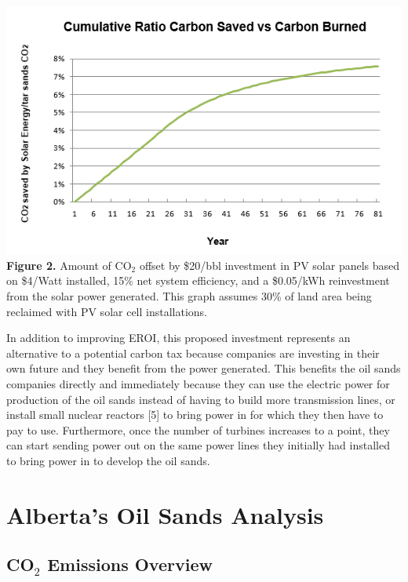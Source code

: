 \documentclass[11pt]{article}
\begin{document}
\begin{center}
\includegraphics{g2.png}
{\bf Figure 2.} Amount of CO$_2$ offset by \$20/bbl investment in PV solar panels based on \$4/Watt installed, 15\% net system efficiency, and a \$0.05/kWh reinvestment from the solar power generated. This graph assumes 30\% of land area being reclaimed with PV solar cell installations. 
\end{center}

In addition to improving EROI, this proposed investment represents an alternative to a potential carbon tax because companies are investing in their own future and they benefit from the power generated.  This benefits the oil sands companies directly and immediately because they can use the electric power for production of the oil sands instead of having to build more transmission lines, or install small nuclear reactors [5] to bring power in for which they then have to pay to use. Furthermore, once the number of turbines increases to a point, they can start sending power out on the same power lines they initially had installed to bring power in to develop the oil sands.


\section{Alberta's Oil Sands Analysis}

\subsection{CO$_2$ Emissions Overview}
\end{document}
